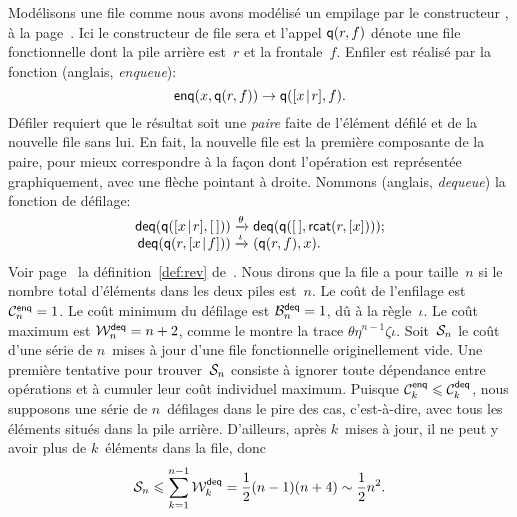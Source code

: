 Modélisons une file comme nous avons modélisé un empilage par le
constructeur , à la
page~\pageref{par:stacks}. Ici le constructeur de file sera
 et l'appel \(\fun{q}(r,f)\) dénote une
file fonctionnelle dont la pile arrière est~\(r\) et la
frontale~\(f\). Enfiler est réalisé par la fonction
 (anglais, \emph{enqueue}):
\begin{equation}
\fun{enq}(x,\fun{q}(r,f)) \rightarrow \fun{q}(\cons{x}{r},f).
\label{def:enq}
\end{equation}
Défiler requiert que le résultat soit une \emph{paire} faite de l'élément défilé et de la nouvelle file
sans lui. En fait, la nouvelle file est la première composante de la
paire, pour mieux correspondre à la façon dont l'opération est
représentée graphiquement, avec une flèche pointant à droite.
Nommons  (anglais, \emph{dequeue})
la fonction de défilage:
\begin{equation}
\begin{array}{@{}r@{\;}l@{\;}l@{}}
  \fun{deq}(\fun{q}(\cons{x}{r},\el))
& \xrightarrow{\smash{\theta}}
& \fun{deq}(\fun{q}(\el,\fun{rcat}(r,[x])));\\
  \fun{deq}(\fun{q}(r,\cons{x}{f}))
& \xrightarrow{\smash{\iota}}
& \pair{\fun{q}(r,f)}{x}.
\end{array}
\label{def:deq}
\end{equation}
Voir page~\pageref{def:rev} la définition~\eqref{def:rev}
de~. Nous dirons que la file a
pour taille~\(n\) si le nombre total d'éléments dans les deux piles
est~\(n\).  Le coût de l'enfilage est
\(\C{\fun{enq}}{n} = 1\). Le coût
minimum du défilage est
\(\B{\fun{deq}}{n} = 1\), dû à la règle~\(\iota\). Le coût maximum est
\(\W{\fun{deq}}{n} = n+2\), comme le montre la trace
\(\theta\eta^{n-1}\zeta\iota\). Soit~\(\A{n}\) le coût d'une série de
\(n\)~mises à jour d'une file fonctionnelle originellement vide. Une
première tentative pour trouver~\(\A{n}\) consiste à ignorer toute
dépendance entre opérations et à cumuler leur coût individuel
maximum. Puisque \(\C{\fun{enq}}{k} \leqslant \C{\fun{deq}}{k}\), nous
supposons une série de \(n\)~défilages dans le pire des cas,
c'est-à-dire, avec tous les éléments situés dans la pile
arrière. D'ailleurs, après \(k\)~mises à jour, il ne peut y avoir plus
de \(k\)~éléments dans la file, donc
\begin{equation*}
\A{n} \leqslant \sum_{k=1}^{n-1}{\W{\fun{deq}}{k}} =
\frac{1}{2}{(n-1)(n+4)} \sim \frac{1}{2}{n^2}.
\end{equation*}

